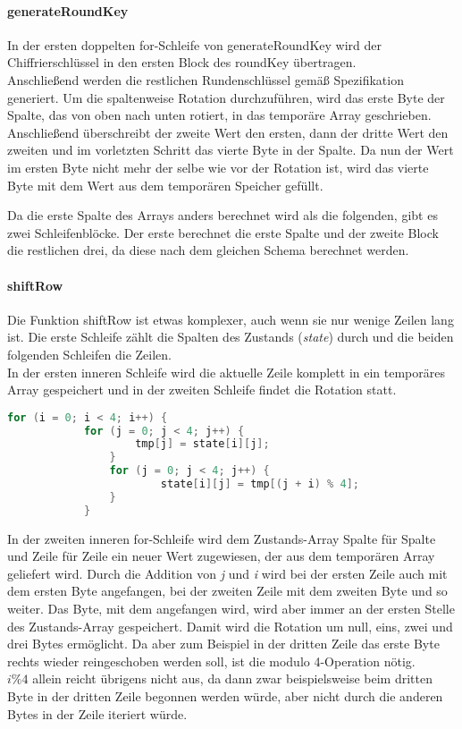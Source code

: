		\paragraph{generateRoundKey}
		In der ersten doppelten for-Schleife von generateRoundKey wird der Chiffrierschlüssel
		in den ersten Block des roundKey übertragen. \\
		Anschließend werden die restlichen Rundenschlüssel gemäß Spezifikation generiert.
		Um die spaltenweise Rotation durchzuführen, wird das erste Byte der Spalte, das von
		oben nach unten rotiert, in das temporäre Array geschrieben. Anschließend
		überschreibt der zweite Wert den ersten, dann der dritte Wert den zweiten und im
		vorletzten Schritt das vierte Byte in der Spalte. Da nun der Wert im ersten Byte
		nicht mehr der selbe wie vor der Rotation ist, wird das vierte Byte mit dem
		Wert aus dem temporären Speicher gefüllt.

		Da die erste Spalte des Arrays anders berechnet wird als die folgenden, gibt es
		zwei Schleifenblöcke. Der erste berechnet die erste Spalte und der zweite Block
		die restlichen drei, da diese nach dem gleichen Schema berechnet werden.

		\paragraph{shiftRow}
		Die Funktion shiftRow ist etwas komplexer, auch wenn sie nur wenige Zeilen lang ist.
		Die erste Schleife zählt die Spalten des Zustands (\emph{state}) durch und die
		beiden folgenden Schleifen die Zeilen. \\
		In der ersten inneren Schleife wird die aktuelle Zeile komplett in ein temporäres
		Array gespeichert und in der zweiten Schleife findet die Rotation statt.

		\begin{lstlisting}[language=C]
		for (i = 0; i < 4; i++) {
			for (j = 0; j < 4; j++) {
		        	tmp[j] = state[i][j];
		        }
	        	for (j = 0; j < 4; j++) {
	            		state[i][j] = tmp[(j + i) % 4];
	        	}
    		}
		\end{lstlisting}

		In der zweiten inneren for-Schleife wird dem Zustands-Array Spalte für Spalte und
		Zeile für Zeile ein neuer Wert zugewiesen, der aus dem temporären Array geliefert
		wird. Durch die Addition von \emph{j} und \emph{i} wird bei der ersten Zeile auch
		mit dem ersten Byte angefangen, bei der zweiten Zeile mit dem zweiten Byte und so
		weiter. Das Byte, mit dem angefangen wird, wird aber immer an der ersten Stelle des
		Zustands-Array gespeichert. Damit wird die Rotation um null, eins, zwei und drei
		Bytes ermöglicht. Da aber zum Beispiel in der dritten Zeile das erste Byte rechts
		wieder reingeschoben werden soll, ist die modulo 4-Operation nötig. \\
		$i \% 4$ allein reicht übrigens nicht aus, da dann zwar beispielsweise beim dritten Byte
		in der dritten Zeile begonnen werden würde, aber nicht durch die
		anderen Bytes in der Zeile iteriert würde. 

